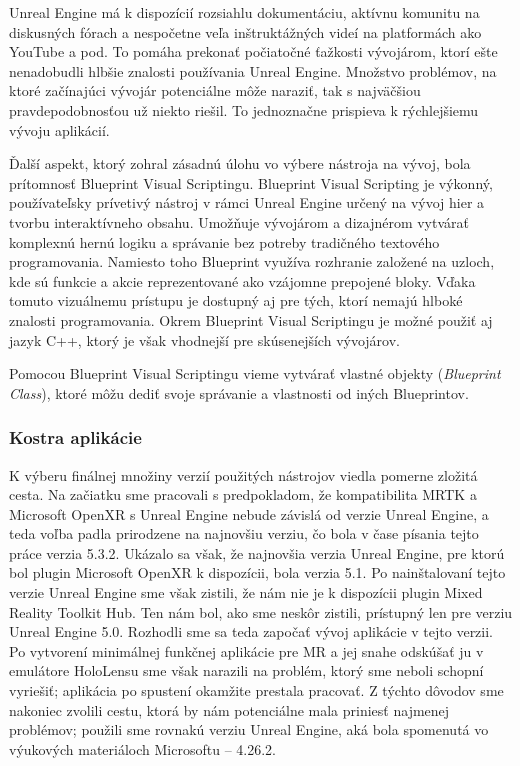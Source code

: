 Unreal Engine má k dispozícií rozsiahlu dokumentáciu, aktívnu komunitu na diskusných fórach a nespočetne veľa inštruktážných videí na platformách ako YouTube a pod. To pomáha prekonať počiatočné
ťažkosti vývojárom, ktorí ešte nenadobudli hlbšie znalosti používania Unreal Engine. Množstvo problémov, na ktoré začínajúci vývojár potenciálne môže naraziť, tak s najväčšiou pravdepodobnosťou
už niekto riešil. To jednoznačne prispieva k rýchlejšiemu vývoju aplikácií.

Ďalší aspekt, ktorý zohral zásadnú úlohu vo výbere nástroja na vývoj, bola prítomnosť Blueprint Visual Scriptingu. Blueprint Visual Scripting je výkonný, používateľsky prívetivý nástroj v rámci 
Unreal Engine určený na vývoj hier a tvorbu interaktívneho obsahu. Umožňuje vývojárom a dizajnérom vytvárať komplexnú hernú logiku a správanie bez potreby tradičného textového programovania. Namiesto toho 
Blueprint využíva rozhranie založené na uzloch, kde sú funkcie a akcie reprezentované ako vzájomne prepojené bloky. Vďaka tomuto vizuálnemu prístupu je dostupný aj pre tých, ktorí nemajú hlboké znalosti programovania.
Okrem Blueprint Visual Scriptingu je možné použiť aj jazyk C++, ktorý je však vhodnejší pre skúsenejších vývojárov.

Pomocou Blueprint Visual Scriptingu vieme vytvárať vlastné objekty (\emph{Blueprint Class}), ktoré môžu dediť svoje správanie a vlastnosti od iných Blueprintov.

\subsubsection{Kostra aplikácie}
K výberu finálnej množiny verzií použitých nástrojov viedla pomerne zložitá cesta. Na začiatku sme pracovali s predpokladom, že kompatibilita MRTK a Microsoft OpenXR s Unreal Engine nebude závislá od verzie Unreal
Engine, a teda voľba padla prirodzene na najnovšiu verziu, čo bola v čase písania tejto práce verzia 5.3.2. Ukázalo sa však, že najnovšia verzia Unreal Engine, pre ktorú bol plugin Microsoft OpenXR k dispozícii, bola verzia 5.1.
Po nainštalovaní tejto verzie Unreal Engine sme však zistili, že nám nie je k dispozícii plugin Mixed Reality Toolkit Hub. Ten nám bol, ako sme neskôr zistili, prístupný len pre verziu Unreal Engine 5.0. Rozhodli sme sa teda
započať vývoj aplikácie v tejto verzii. Po vytvorení minimálnej funkčnej aplikácie pre MR a jej snahe odskúšať ju v emulátore HoloLensu sme však narazili na problém, ktorý sme neboli schopní vyriešiť; aplikácia po spustení
okamžite prestala pracovať. 
Z týchto dôvodov sme nakoniec zvolili cestu, ktorá by nám potenciálne mala priniesť najmenej problémov; použili sme rovnakú verziu Unreal Engine, aká bola spomenutá vo výukových materiáloch Microsoftu {--} 4.26.2.

